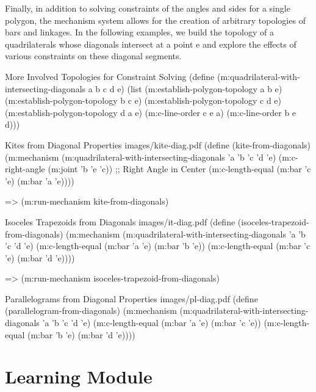 Finally, in addition to solving constraints of the angles and sides
for a single polygon, the mechanism system allows for the creation of
arbitrary topologies of bars and linkages. In the following examples,
we build the topology of a quadrilaterals whose diagonals intersect at
a point e and explore the effects of various constraints on these
diagonal segments.

\begin{code-example}
[label=quad-diagonals]
{More Involved Topologies for Constraint Solving}
(define (m:quadrilateral-with-intersecting-diagonals a b c d e)
  (list (m:establish-polygon-topology a b e)
        (m:establish-polygon-topology b c e)
        (m:establish-polygon-topology c d e)
        (m:establish-polygon-topology d a e)
        (m:c-line-order c e a)
        (m:c-line-order b e d)))
\end{code-example}

\begin{pdf-example}
{Kites from Diagonal Properties}
{images/kite-diag.pdf}
(define (kite-from-diagonals)
  (m:mechanism
   (m:quadrilateral-with-intersecting-diagonals 'a 'b 'c 'd 'e)
   (m:c-right-angle (m:joint 'b 'e 'c)) ;; Right Angle in Center
   (m:c-length-equal (m:bar 'c 'e) (m:bar 'a 'e))))

=> (m:run-mechanism kite-from-diagonals)
\end{pdf-example}

\begin{pdf-example}
{Isoceles Trapezoids from Diagonals}
{images/it-diag.pdf}
(define (isoceles-trapezoid-from-diagonals)
  (m:mechanism
   (m:quadrilateral-with-intersecting-diagonals 'a 'b 'c 'd 'e)
   (m:c-length-equal (m:bar 'a 'e) (m:bar 'b 'e))
   (m:c-length-equal (m:bar 'c 'e) (m:bar 'd 'e))))

=> (m:run-mechanism isoceles-trapezoid-from-diagonals)
\end{pdf-example}

\begin{pdf-example}
{Parallelograms from Diagonal Properties}
{images/pl-diag.pdf}
(define (parallelogram-from-diagonals)
  (m:mechanism
   (m:quadrilateral-with-intersecting-diagonals 'a 'b 'c 'd 'e)
   (m:c-length-equal (m:bar 'a 'e) (m:bar 'c 'e))
   (m:c-length-equal (m:bar 'b 'e) (m:bar 'd 'e))))
\end{pdf-example}

\section{Learning Module}

